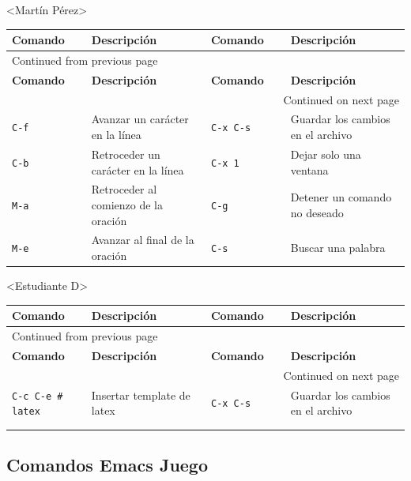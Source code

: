 \documentclass{article}
\begin{document}
<Martín Pérez>
\begin{longtable}{|p{0.2\linewidth}|p{0.3\linewidth}|p{0.2\linewidth}|p{0.3\linewidth}|}
\textbf{Comando} & \textbf{Descripción} & \textbf{Comando} & \textbf{Descripción}\\[0pt]
\hline
\endfirsthead
\multicolumn{4}{l}{Continued from previous page} \\[0pt]
\hline

\textbf{Comando} & \textbf{Descripción} & \textbf{Comando} & \textbf{Descripción} \\[0pt]

\hline
\endhead
\hline\multicolumn{4}{r}{Continued on next page} \\
\endfoot
\endlastfoot
\hline
\texttt{C-f} & Avanzar un carácter en la línea & \texttt{C-x C-s} & Guardar los cambios en el archivo\\[0pt]
\texttt{C-b} & Retroceder un carácter en la línea & \texttt{C-x 1} & Dejar solo una ventana\\[0pt]
\texttt{M-a} & Retroceder al comienzo de la oración & \texttt{C-g} & Detener un comando no deseado\\[0pt]
\texttt{M-e} & Avanzar al final de la oración & \texttt{C-s} & Buscar una palabra\\[0pt]
\end{longtable}

<Estudiante D>
\begin{longtable}{|p{0.2\linewidth}|p{0.3\linewidth}|p{0.2\linewidth}|p{0.3\linewidth}|}
\textbf{Comando} & \textbf{Descripción} & \textbf{Comando} & \textbf{Descripción}\\[0pt]
\hline
\endfirsthead
\multicolumn{4}{l}{Continued from previous page} \\[0pt]
\hline

\textbf{Comando} & \textbf{Descripción} & \textbf{Comando} & \textbf{Descripción} \\[0pt]

\hline
\endhead
\hline\multicolumn{4}{r}{Continued on next page} \\
\endfoot
\endlastfoot
\hline
\texttt{C-c C-e \# latex} & Insertar template de  latex & \texttt{C-x C-s} & Guardar los cambios en el archivo\\[0pt]
 &  &  & \\[0pt]
 &  &  & \\[0pt]
\end{longtable}
\subsection{Comandos Emacs Juego}
\label{sec:org990b53d}
\end{document}
